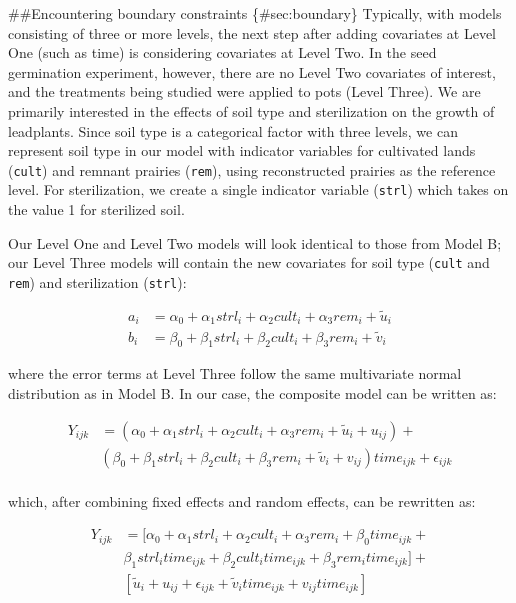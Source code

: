 \documentclass[
]{krantz}
\begin{document}
\#\#Encountering boundary constraints \{\#sec:boundary\}
Typically, with models consisting of three or more levels, the next step after adding covariates at Level One (such as time) is considering covariates at Level Two. In the seed germination experiment, however, there are no Level Two covariates of interest, and the treatments being studied were applied to pots (Level Three). We are primarily interested in the effects of soil type and sterilization on the growth of leadplants. Since soil type is a categorical factor with three levels, we can represent soil type in our model with indicator variables for cultivated lands (\texttt{cult}) and remnant prairies (\texttt{rem}), using reconstructed prairies as the reference level. For sterilization, we create a single indicator variable (\texttt{strl}) which takes on the value 1 for sterilized soil.

Our Level One and Level Two models will look identical to those from Model B; our Level Three models will contain the new covariates for soil type (\texttt{cult} and \texttt{rem}) and sterilization (\texttt{strl}):

\begin{align*}
a_{i} & = \alpha_{0}+\alpha_{1}\textstyle{strl}_{i}+\alpha_{2}\textstyle{cult}_{i}+\alpha_{3}\textstyle{rem}_{i}+\tilde{u}_{i} \\
b_{i} & = \beta_{0}+\beta_{1}\textstyle{strl}_{i}+\beta_{2}\textstyle{cult}_{i}+\beta_{3}\textstyle{rem}_{i}+\tilde{v}_{i}
\end{align*}

where the error terms at Level Three follow the same multivariate normal distribution as in Model B. In our case, the composite model can be written as:

\begin{align*}
Y_{ijk} & = (\alpha_{0}+\alpha_{1}\textstyle{strl}_{i}+\alpha_{2}\textstyle{cult}_{i}+\alpha_{3}\textstyle{rem}_{i}+\tilde{u}_{i}+u_{ij}) + \\
 & (\beta_{0}+\beta_{1}\textstyle{strl}_{i}+\beta_{2}\textstyle{cult}_{i}+\beta_{3}\textstyle{rem}_{i}+\tilde{v}_{i}+
 v_{ij})\textstyle{time}_{ijk}+\epsilon_{ijk} \\
\end{align*}

which, after combining fixed effects and random effects, can be rewritten as:

\begin{align*}
Y_{ijk} & = [\alpha_{0}+\alpha_{1}\textstyle{strl}_{i}+\alpha_{2}\textstyle{cult}_{i}+\alpha_{3}\textstyle{rem}_{i} +
 \beta_{0}\textstyle{time}_{ijk} + \\
 & \beta_{1}\textstyle{strl}_{i}\textstyle{time}_{ijk}+\beta_{2}\textstyle{cult}_{i}\textstyle{time}_{ijk}+ \beta_{3}\textstyle{rem}_{i}\textstyle{time}_{ijk}] + \\
 & [\tilde{u}_{i}+u_{ij}+\epsilon_{ijk}+\tilde{v}_{i}\textstyle{time}_{ijk}+v_{ij}\textstyle{time}_{ijk}]
\end{align*}
\end{document}
